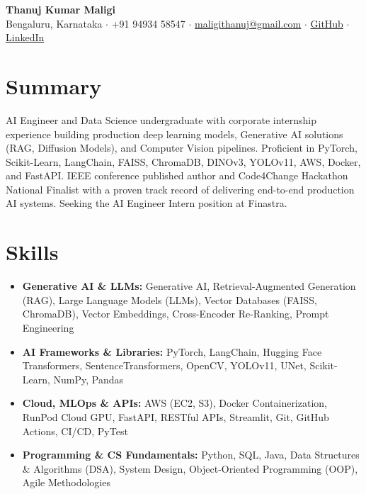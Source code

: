 \documentclass[a4paper,10pt]{article}
\begin{document}

\begin{center}
{\LARGE \textbf{Thanuj Kumar Maligi}}\\[1pt]
Bengaluru, Karnataka $\cdot$ +91 94934 58547 $\cdot$ \href{mailto:maligithanuj@gmail.com}{maligithanuj@gmail.com} $\cdot$ \href{https://github.com/ThanujMaligi}{GitHub} $\cdot$ \href{https://www.linkedin.com/in/thanuj-kumar-maligi-8882b2288}{LinkedIn}
\end{center}


\section*{Summary}
AI Engineer and Data Science undergraduate with corporate internship experience building production deep learning models, Generative AI solutions (RAG, Diffusion Models), and Computer Vision pipelines. Proficient in PyTorch, Scikit-Learn, LangChain, FAISS, ChromaDB, DINOv3, YOLOv11, AWS, Docker, and FastAPI. IEEE conference published author and Code4Change Hackathon National Finalist with a proven track record of delivering end-to-end production AI systems. Seeking the AI Engineer Intern position at Finastra.


\section*{Skills}
\begin{itemize}[leftmargin=*,noitemsep,topsep=1pt,parsep=0pt,partopsep=0pt]
\item \textbf{Generative AI \& LLMs:} Generative AI, Retrieval-Augmented Generation (RAG), Large Language Models (LLMs), Vector Databases (FAISS, ChromaDB), Vector Embeddings, Cross-Encoder Re-Ranking, Prompt Engineering
\item \textbf{AI Frameworks \& Libraries:} PyTorch, LangChain, Hugging Face Transformers, SentenceTransformers, OpenCV, YOLOv11, UNet, Scikit-Learn, NumPy, Pandas
\item \textbf{Cloud, MLOps \& APIs:} AWS (EC2, S3), Docker Containerization, RunPod Cloud GPU, FastAPI, RESTful APIs, Streamlit, Git, GitHub Actions, CI/CD, PyTest
\item \textbf{Programming \& CS Fundamentals:} Python, SQL, Java, Data Structures \& Algorithms (DSA), System Design, Object-Oriented Programming (OOP), Agile Methodologies
\end{itemize}
\end{document}
